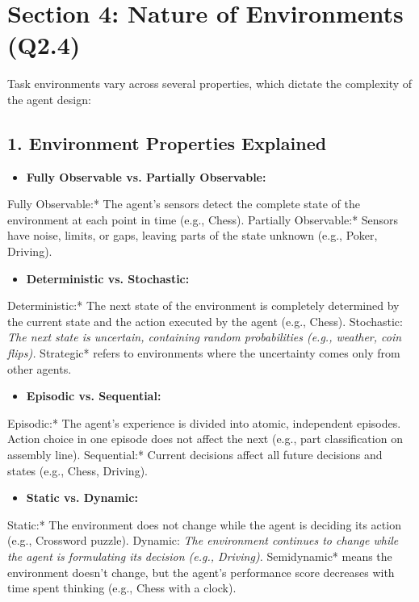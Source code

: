 \section{Section 4: Nature of Environments (Q2.4)}

Task environments vary across several properties, which dictate the complexity of the agent design:

\subsection{1. Environment Properties Explained}

\begin{itemize}
  \item   \textbf{Fully Observable vs. Partially Observable:}
\end{itemize}
    \textit{   }Fully Observable:* The agent's sensors detect the complete state of the environment at each point in time (e.g., Chess).
    \textit{   }Partially Observable:* Sensors have noise, limits, or gaps, leaving parts of the state unknown (e.g., Poker, Driving).
\begin{itemize}
  \item   \textbf{Deterministic vs. Stochastic:}
\end{itemize}
    \textit{   }Deterministic:* The next state of the environment is completely determined by the current state and the action executed by the agent (e.g., Chess).
    \textit{   }Stochastic:\textit{ The next state is uncertain, containing random probabilities (e.g., weather, coin flips). }Strategic* refers to environments where the uncertainty comes only from other agents.
\begin{itemize}
  \item   \textbf{Episodic vs. Sequential:}
\end{itemize}
    \textit{   }Episodic:* The agent’s experience is divided into atomic, independent episodes. Action choice in one episode does not affect the next (e.g., part classification on assembly line).
    \textit{   }Sequential:* Current decisions affect all future decisions and states (e.g., Chess, Driving).
\begin{itemize}
  \item   \textbf{Static vs. Dynamic:}
\end{itemize}
    \textit{   }Static:* The environment does not change while the agent is deciding its action (e.g., Crossword puzzle).
    \textit{   }Dynamic:\textit{ The environment continues to change while the agent is formulating its decision (e.g., Driving). }Semidynamic* means the environment doesn't change, but the agent's performance score decreases with time spent thinking (e.g., Chess with a clock).

